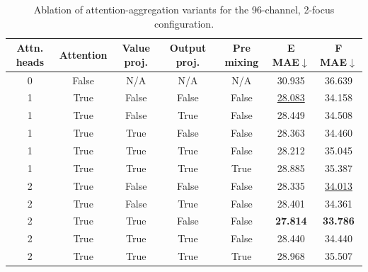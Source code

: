 \begin{table}[ht]
    \centering
    \scriptsize
    \caption{Ablation of attention-aggregation variants for the 96-channel, 2-focus configuration.}
    \label{tab:sm_attention_96x2}
    \begin{tabular*}{\linewidth}{@{\extracolsep{\fill}}ccccccc@{}}
        \toprule
        \textbf{Attn. heads}       & \textbf{Attention}         & \textbf{Value proj.} &
        \textbf{Output proj.}      & \textbf{Pre mixing}        &
        \textbf{E MAE}$\downarrow$ & \textbf{F MAE}$\downarrow$                                                                            \\
        \midrule
        0                          & False                      & N/A                  & N/A   & N/A   & 30.935          & 36.639          \\
        1                          & True                       & False                & False & False & \underline{28.083} & 34.158          \\
        1                          & True                       & False                & True  & False & 28.449          & 34.508          \\
        1                          & True                       & True                 & False & False & 28.363          & 34.460          \\
        1                          & True                       & True                 & True  & False & 28.212          & 35.045          \\
        1                          & True                       & True                 & True  & True  & 28.885          & 35.387          \\
        2                          & True                       & False                & False & False & 28.335          & \underline{34.013} \\
        2                          & True                       & False                & True  & False & 28.401          & 34.361          \\
        2                          & True                       & True                 & False & False & \textbf{27.814} & \textbf{33.786} \\
        2                          & True                       & True                 & True  & False & 28.440          & 34.440          \\
        2                          & True                       & True                 & True  & True  & 28.968          & 35.507          \\

\end{tabular*}
\end{table}

